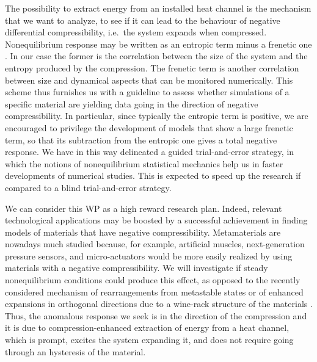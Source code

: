 \begin{workpackage}
\begin{wpdescription}
The possibility to extract energy from an installed heat channel is the mechanism that we want to
analyze, to see if it can lead to the behaviour of negative differential compressibility,
i.e.~the system expands when compressed. 
Nonequilibrium response may be written as an entropic term minus a frenetic one \cite{BMW09}.
In our case the former is the correlation between the size of the system and the entropy produced by the compression.
The frenetic term is another correlation between size and dynamical aspects that can be monitored numerically.
This scheme thus furnishes us with a guideline to assess whether simulations of a specific material are yielding data 
going in the direction of negative compressibility. In particular, since typically the entropic term is positive, we
are encouraged to privilege the development of models that show a large frenetic term, so that its subtraction from
the entropic one gives a total negative response.
We have in this way delineated a guided trial-and-error strategy, in which the notions of 
nonequilibrium statistical mechanics help us in faster developments of numerical studies. This is expected to
speed up the research if compared to a blind trial-and-error strategy.


We can consider this WP as a high reward research plan. Indeed, relevant technological applications
may be boosted by a successful achievement in finding models of materials that have negative compressibility.
Metamaterials are nowadays much studied \cite{NM12,CG15} because, for example, artificial muscles,
next-generation pressure sensors, and micro-actuators would be
more easily realized by using materials with a negative compressibility. We will investigate
if steady nonequilibrium conditions could produce this effect, as opposed to the recently considered 
mechanism of rearrangements from metastable states \cite{NM12} or of enhanced expansions in orthogonal directions
due to a wine-rack structure of the materials \cite{CG15}. Thus, the anomalous response we seek is in the direction
of the compression and it is due to compression-enhanced extraction of energy from a heat channel,
which is prompt, excites the system expanding it, 
and does not require going through an hysteresis of the material. 

\printbibliography[heading=proposal-bib,env=proposal-env]

\end{wpdescription}

\begin{tasklist}


\end{tasklist}
\end{workpackage}
